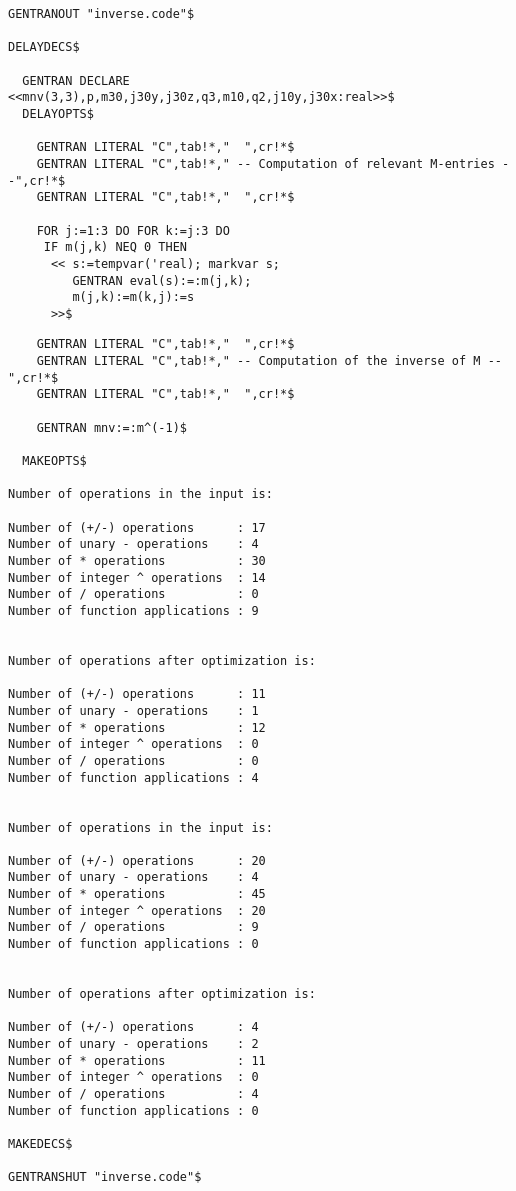 {{\begin{verbatim}
GENTRANOUT "inverse.code"$

DELAYDECS$

  GENTRAN DECLARE <<mnv(3,3),p,m30,j30y,j30z,q3,m10,q2,j10y,j30x:real>>$
  DELAYOPTS$

    GENTRAN LITERAL "C",tab!*,"  ",cr!*$
    GENTRAN LITERAL "C",tab!*," -- Computation of relevant M-entries --",cr!*$
    GENTRAN LITERAL "C",tab!*,"  ",cr!*$

    FOR j:=1:3 DO FOR k:=j:3 DO
     IF m(j,k) NEQ 0 THEN
      << s:=tempvar('real); markvar s;
         GENTRAN eval(s):=:m(j,k);
         m(j,k):=m(k,j):=s
      >>$
\end{verbatim}}
{\small
\begin{verbatim}
    GENTRAN LITERAL "C",tab!*,"  ",cr!*$
    GENTRAN LITERAL "C",tab!*," -- Computation of the inverse of M --",cr!*$
    GENTRAN LITERAL "C",tab!*,"  ",cr!*$

    GENTRAN mnv:=:m^(-1)$

  MAKEOPTS$

Number of operations in the input is:

Number of (+/-) operations      : 17
Number of unary - operations    : 4
Number of * operations          : 30
Number of integer ^ operations  : 14
Number of / operations          : 0
Number of function applications : 9


Number of operations after optimization is:

Number of (+/-) operations      : 11
Number of unary - operations    : 1
Number of * operations          : 12
Number of integer ^ operations  : 0
Number of / operations          : 0
Number of function applications : 4


Number of operations in the input is:

Number of (+/-) operations      : 20
Number of unary - operations    : 4
Number of * operations          : 45
Number of integer ^ operations  : 20
Number of / operations          : 9
Number of function applications : 0


Number of operations after optimization is:

Number of (+/-) operations      : 4
Number of unary - operations    : 2
Number of * operations          : 11
Number of integer ^ operations  : 0
Number of / operations          : 4
Number of function applications : 0

MAKEDECS$

GENTRANSHUT "inverse.code"$
\end{verbatim}}

}
